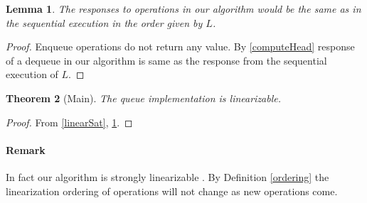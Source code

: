 \documentclass[10pt]{article}
\newtheorem{theorem}{Theorem}
\newtheorem{lemma}[theorem]{Lemma}
\theoremstyle{definition}
\begin{document}
\begin{lemma}\label{linearCorrect}
The responses to operations in our algorithm would be the same as in the sequential execution in the order given by $L$.
\end{lemma}
\begin{proof}
Enqueue operations do not return any value. By \ref{computeHead} response of a dequeue in our algorithm is same as the response from the sequential execution of $L$.  
\end{proof}

\begin{theorem}[Main]
The queue implementation is linearizable.
\end{theorem}
\begin{proof}
From \ref{linearSat}, \ref{linearCorrect}.
\end{proof}

\paragraph{Remark} In fact our algorithm is strongly linearizable \cite{DBLP:conf/stoc/GolabHW11}. By Definition \ref{ordering} the linearization ordering of operations will not change as new operations come.
\pagebreak
\end{document}
